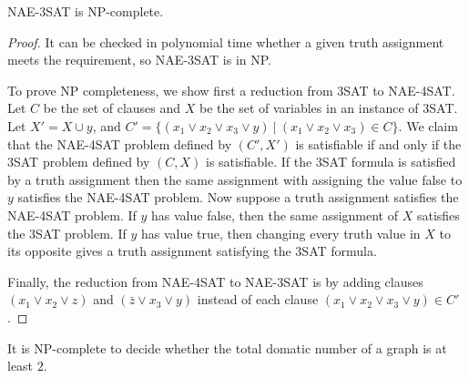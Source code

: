 \begin{thm}
  NAE-3SAT is NP-complete.
\end{thm}
\begin{proof}
  It can be checked in polynomial time whether a given truth assignment meets the
  requirement, so NAE-3SAT is in NP.

  To prove NP completeness, we show first a reduction from 3SAT to NAE-4SAT.
  Let $C$ be the set of clauses and $X$ be the set of variables in an instance of
  3SAT. Let $X' = X \cup y$, and $C' = \{(x_1 \vee x_2 \vee x_3 \vee y)\ |\
  (x_1 \vee x_2 \vee x_3) \in C\}$. We claim that the NAE-4SAT problem defined
  by $(C', X')$ is satisfiable if and only if the 3SAT problem defined by $(C, X)$
  is satisfiable. If the 3SAT formula is satisfied by a truth assignment then
  the same assignment with assigning the value false to $y$ satisfies the NAE-4SAT
  problem. Now suppose a truth assignment satisfies the NAE-4SAT problem. If $y$
  has value false, then the same assignment of $X$ satisfies the 3SAT problem.
  If $y$ has value true, then changing every truth value in $X$ to its opposite
  gives a truth assignment satisfying the 3SAT formula.

  Finally, the reduction from NAE-4SAT to NAE-3SAT is by adding clauses
  $(x_1 \vee x_2 \vee z)$ and $(\bar{z} \vee x_3 \vee y)$ instead of each clause
  $(x_1 \vee x_2 \vee x_3 \vee y) \in C'$.
\end{proof}

\begin{thm}
  It is NP-complete to decide whether the total domatic number of
  a graph is at least $2$.
\end{thm}

